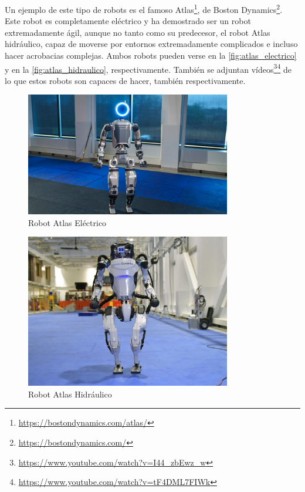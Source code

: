Un ejemplo de este tipo de robots es el famoso Atlas\footnote{\url{https://bostondynamics.com/atlas/}}, de Boston Dynamics\footnote{\url{https://bostondynamics.com/}}. Este robot es completamente eléctrico y ha demostrado ser un robot extremadamente ágil, aunque no tanto como su predecesor, el robot Atlas hidráulico, capaz de moverse por entornos extremadamente complicados e incluso hacer acrobacias complejas. Ambos robots pueden verse en la \autoref{fig:atlas_electrico} y en la \autoref{fig:atlas_hidraulico}, respectivamente. También se adjuntan vídeos\footnote{\url{https://www.youtube.com/watch?v=I44_zbEwz_w}}\footnote{\url{https://www.youtube.com/watch?v=tF4DML7FIWk}} de lo que estos robots son capaces de hacer, también respectivamente.

\begin{figure}[H]
    \centering
    \includegraphics[width=0.8\textwidth]{figures/cap_1/atlas_electrico.jpg}
    \caption{Robot Atlas Eléctrico}
    \label{fig:atlas_electrico}
\end{figure}

\begin{figure}[H]
    \centering
    \includegraphics[width=0.8\textwidth]{figures/cap_1/atlas_hidraulico.jpg}
    \caption{Robot Atlas Hidráulico}
    \label{fig:atlas_hidraulico}
\end{figure}

